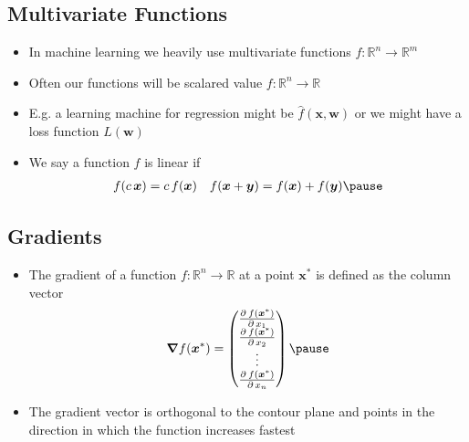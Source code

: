 
\begin{slide}
\section{Multivariate Functions}

\begin{PauseHighLight}
  \begin{itemize}
  \item In machine learning we heavily use multivariate functions
    $f:\mathbb{R}^n \rightarrow \mathbb{R}^m$\pause
  \item Often our functions will be scalared value $f:\mathbb{R}^n
    \rightarrow \mathbb{R}$\pause
  \item E.g. a learning machine for regression might be
    $\hat{f}(\bm{x}, \bm{w})$\pause{} or we might have a loss function $L(\bm{w})$\pauseb
  \item We say a function $f$ is linear if
    \begin{align*}
      f(c\, \bm{x}) &= c\, f(\bm{x}) & f(\bm{x}+\bm{y}) = f(\bm{x}) +
                                       f(\bm{y})\pause
    \end{align*}
  \end{itemize}
\end{PauseHighLight}

\end{slide}


\begin{slide}
\section{Gradients}

\begin{PauseHighLight}
  \begin{itemize}
  \item The gradient of a function $f:\mathbb{R}^n
    \rightarrow \mathbb{R}$ at a point $\bm{x}^*$ is defined as the
    column vector
    \begin{align*}
      \grad f(\bm{x}^*) =
      \begin{pmatrix}
        \pd{f(\bm{x}^*)}{x_1} \\
        \pd{f(\bm{x}^*)}{x_2} \\
        \vdots \\
        \pd{f(\bm{x}^*)}{x_n}
      \end{pmatrix}\pause
    \end{align*}
  \item The gradient vector is orthogonal to the contour plane and
    points in the direction in which the function increases fastest\pause 
  \end{itemize}
\end{PauseHighLight}

\end{slide}


